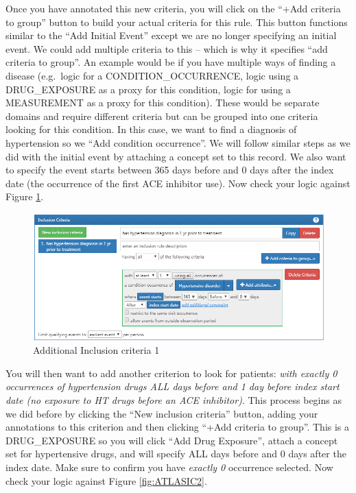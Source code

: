 \documentclass[11pt]{book}
\theoremstyle{definition}
\theoremstyle{definition}
\theoremstyle{definition}
\theoremstyle{remark}
\begin{document}
Once you have annotated this new criteria, you will click on the ``+Add criteria to group'' button to build your actual criteria for this rule. This button functions similar to the ``Add Initial Event'' except we are no longer specifying an initial event. We could add multiple criteria to this -- which is why it specifies ``add criteria to group''. An example would be if you have multiple ways of finding a disease (e.g.~logic for a CONDITION\_OCCURRENCE, logic using a DRUG\_EXPOSURE as a proxy for this condition, logic for using a MEASUREMENT as a proxy for this condition). These would be separate domains and require different criteria but can be grouped into one criteria looking for this condition. In this case, we want to find a diagnosis of hypertension so we ``Add condition occurrence''. We will follow similar steps as we did with the initial event by attaching a concept set to this record. We also want to specify the event starts between 365 days before and 0 days after the index date (the occurrence of the first ACE inhibitor use). Now check your logic against Figure \ref{fig:ATLASIC1}.

\begin{figure}

{\centering \includegraphics[width=1\linewidth]{images/Cohorts/ATLAS-IC1} 

}

\caption{Additional Inclusion criteria 1}\label{fig:ATLASIC1}
\end{figure}

You will then want to add another criterion to look for patients: \emph{with exactly 0 occurrences of hypertension drugs ALL days before and 1 day before index start date (no exposure to HT drugs before an ACE inhibitor)}. This process begins as we did before by clicking the ``New inclusion criteria'' button, adding your annotations to this criterion and then clicking ``+Add criteria to group''. This is a DRUG\_EXPOSURE so you will click ``Add Drug Exposure'', attach a concept set for hypertensive drugs, and will specify ALL days before and 0 days after the index date. Make sure to confirm you have \emph{exactly 0} occurrence selected. Now check your logic against Figure \ref{fig:ATLASIC2}.
\end{document}

